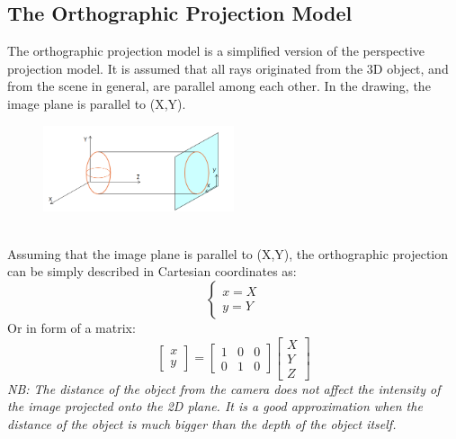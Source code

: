 \subsection{The Orthographic Projection Model}
The orthographic projection model is a simplified version of the perspective projection model. It is assumed that all rays originated from the 3D object, and from the scene in general, are parallel among each other. 
In the drawing, the image plane is parallel to (X,Y).
\begin{figure}[h]
    \centering
    \includegraphics[width=0.5\textwidth]{Figures/Orthographic_proj.png}
\end{figure}
\\Assuming that the image plane is parallel to (X,Y), the orthographic projection
can be simply described in Cartesian coordinates as:
\[
    \begin{cases}
        x = X \\
        y = Y
    \end{cases}
\]
Or in form of a matrix:
\[
    \begin{bmatrix}
        x \\
        y
    \end{bmatrix} = \begin{bmatrix}
        1 & 0 & 0 \\
        0 & 1 & 0
    \end{bmatrix} \begin{bmatrix}
        X \\
        Y \\
        Z
    \end{bmatrix}   
\]
\textit{NB: The distance of the object from the camera does not affect the intensity of the image projected onto the 2D plane.
It is a good approximation when the distance of the object is much bigger than the depth of the object itself. }


